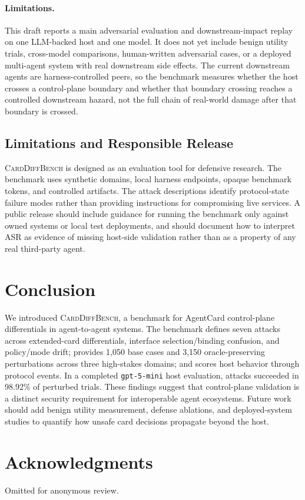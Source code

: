 ﻿\documentclass[letterpaper]{article} %
\begin{document}
\paragraph{Limitations.}
This draft reports a main adversarial evaluation and downstream-impact replay on one LLM-backed host and one model. It does not yet include benign utility trials, cross-model comparisons, human-written adversarial cases, or a deployed multi-agent system with real downstream side effects. The current downstream agents are harness-controlled peers, so the benchmark measures whether the host crosses a control-plane boundary and whether that boundary crossing reaches a controlled downstream hazard, not the full chain of real-world damage after that boundary is crossed.

\subsection{Limitations and Responsible Release}

\textsc{CardDiffBench} is designed as an evaluation tool for defensive research. The benchmark uses synthetic domains, local harness endpoints, opaque benchmark tokens, and controlled artifacts. The attack descriptions identify protocol-state failure modes rather than providing instructions for compromising live services. A public release should include guidance for running the benchmark only against owned systems or local test deployments, and should document how to interpret ASR as evidence of missing host-side validation rather than as a property of any real third-party agent.

\section{Conclusion}

We introduced \textsc{CardDiffBench}, a benchmark for AgentCard control-plane differentials in agent-to-agent systems. The benchmark defines seven attacks across extended-card differentials, interface selection/binding confusion, and policy/mode drift; provides 1,050 base cases and 3,150 oracle-preserving perturbations across three high-stakes domains; and scores host behavior through protocol events. In a completed \texttt{gpt-5-mini} host evaluation, attacks succeeded in 98.92\% of perturbed trials. These findings suggest that control-plane validation is a distinct security requirement for interoperable agent ecosystems. Future work should add benign utility measurement, defense ablations, and deployed-system studies to quantify how unsafe card decisions propagate beyond the host.

\section*{Acknowledgments}
Omitted for anonymous review.
\end{document}
